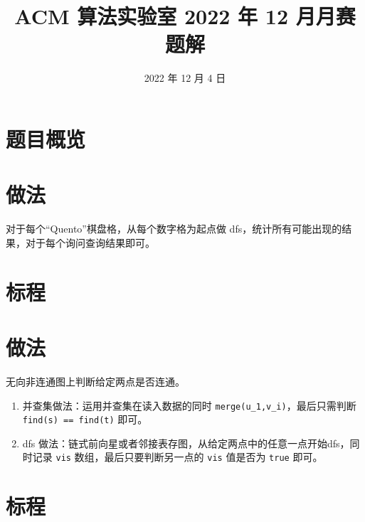 \documentclass{../cpct/ctsol}
\title{ACM 算法实验室 2022 年 12 月月赛题解}
\date{2022 年 12 月 4 日}
\begin{document}
\maketitle
{}

\section*{题目概览}

\solutiontab

\makesolution
\section*{做法}

对于每个“Quento”棋盘格，从每个数字格为起点做 dfs，统计所有可能出现的结果，对于每个询问查询结果即可。

\section*{标程}


\makesolution
\section*{做法}

无向非连通图上判断给定两点是否连通。

\begin{enumerate}
    \item 并查集做法：运用并查集在读入数据的同时 \lstinline{merge(u_1,v_i)}，最后只需判断 \lstinline{find(s) == find(t)} 即可。
    \item dfs 做法：链式前向星或者邻接表存图，从给定两点中的任意一点开始dfs，同时记录 \texttt{vis} 数组，最后只要判断另一点的 \texttt{vis} 值是否为 \texttt{true} 即可。
\end{enumerate}

\section*{标程}
\end{document}
